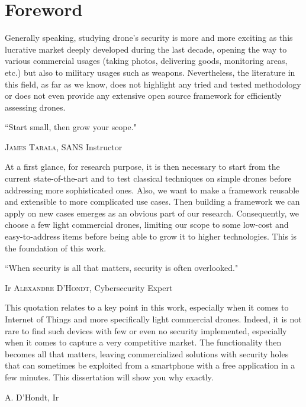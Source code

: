 \chapter*{Foreword}
\thispagestyle{empty}

\vspace{-2cm}
\vfill

\begin{center}
\begin{minipage}{15cm}
Generally speaking, studying drone's security is more and more exciting as this lucrative market deeply developed during the last decade, opening the way to various commercial usages (taking photos, delivering goods, monitoring areas, etc.) but also to military usages such as weapons. Nevertheless, the literature in this field, as far as we know, does not highlight any tried and tested methodology or does not even provide any extensive open source framework for efficiently assessing drones.

\vspace{-1.2cm}
\epigraph{``Start small, then grow your scope."}{\normalfont \textsc{James Tarala}, SANS Instructor}
\vspace{-1.2cm}

At a first glance, for research purpose, it is then necessary to start from the current state-of-the-art and to test classical techniques on simple drones before addressing more sophisticated ones. Also, we want to make a framework reusable and extensible to more complicated use cases. Then building a framework we can apply on new cases emerges as an obvious part of our research. Consequently, we choose a few light commercial drones, limiting our scope to some low-cost and easy-to-address items before being able to grow it to higher technologies. This is the foundation of this work.

\epigraph{``When security is all that matters, \newline security is often overlooked."}{Ir \textsc{Alexandre D'Hondt}, Cybersecurity Expert}
\vspace{-1.2cm}
This quotation relates to a key point in this work, especially when it comes to Internet of Things and more specifically light commercial drones. Indeed, it is not rare to find such devices with few or even no security implemented, especially when it comes to capture a very competitive market. The functionality then becomes all that matters, leaving commercialized solutions with security holes that can sometimes be exploited from a smartphone with a free application in a few minutes. This dissertation will show you why exactly.

\vspace{1cm}
\begin{flushright}
\begin{minipage}{4cm}
\raggedleft
A. D'Hondt, Ir
\end{minipage}
\end{flushright}

\end{minipage}
\end{center}

\vfill
